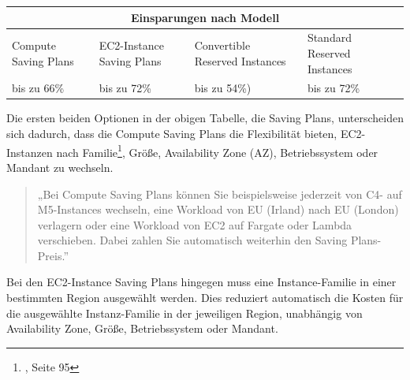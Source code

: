 \begin{table}[h!]
    \centering
    \begin{tabular}{ |p{3cm}||p{3cm}|p{3.6cm}|p{3.6cm}|  }
        \hline
        \multicolumn{4}{|c|}{Einsparungen nach Modell}                                                                    \\
        \hline
        Compute Saving Plans & EC2-Instance Saving Plans & Convertible Reserved Instances & Standard Reserved Instances \\
        \hline
        bis zu 66\%           & bis zu 72\%
                              & bis zu 54\%)               & bis zu 72\%
        \\
        \hline
    \end{tabular}
    {\cite{AMZ07,AMZ11}}
\end{table}
Die ersten beiden Optionen in der obigen Tabelle, die Saving Plans, unterscheiden sich dadurch, dass die Compute Saving Plans die Flexibilität bieten, EC2-Instanzen nach Familie\footnote{\cite{AWS1}, Seite 95}, Größe, Availability Zone (AZ), Betriebssystem oder Mandant zu wechseln.
\begin{quote}
    „Bei Compute Saving Plans können Sie beispielsweise jederzeit von C4- auf M5-Instances wechseln, eine Workload von EU (Irland) nach EU (London) verlagern oder eine Workload von EC2 auf Fargate oder Lambda verschieben. Dabei zahlen Sie automatisch weiterhin den Saving Plans-Preis.”
    {\cite{AMZ11}}
\end{quote}
Bei den EC2-Instance Saving Plans hingegen muss eine Instance-Familie in einer bestimmten Region ausgewählt werden.  Dies reduziert automatisch die Kosten für die ausgewählte Instanz-Familie in der jeweiligen Region, unabhängig von Availability Zone, Größe, Betriebssystem oder Mandant.
